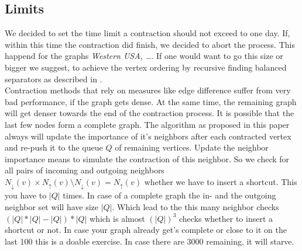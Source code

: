 \subsection{Limits}

We decided to set the time limit a contraction should not exceed to one day. If, within this time the contraction did finish, we decided to abort the process. This happend for the graphs \textit{Western USA, …}. If one would want to go this size or bigger we suggest,
to achieve the vertex ordering by recursive finding balanced separators as described in \cite[Customization Contraction Hierarchies]{CCH}. 
\\
Contraction methods that rely on measures like edge difference suffer from very bad performance, if the graph gets dense. At the same time, the remaining graph will get denser towards the end of the contraction process. It is possible  that the last few nodes form a complete graph. The algorithm
as proposed in this paper always will update the importance  of it's neighbors  after each contracted vertex and re-push it to the queue $Q$ of remaining vertices. Update the neighbor importance means to simulate the contraction of this neighbor. So we check for all pairs of incoming and outgoing neighbors $N_\downarrow(v) \times N_\uparrow(v) \setminus N_\downarrow(v) = N_\uparrow(v)$ whether we have to insert a shortcut. 
This you have to $|Q|$ times. In case of a complete graph the in- and the outgoing neighbor set will have size $|Q|$. Which lead to the this many neighbor checks $(|Q| * |Q| - |Q|)*|Q|$ which is almost $(|Q|)^3$ checks whether to insert a shortcut or not. In case your graph already get's complete or close to it on the last 
100 this is a doable exercise. In case there are 3000 remaining, it will starve. 


